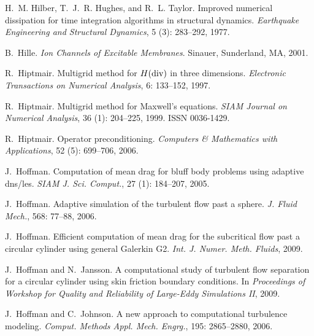 \begin{thebibliography}{467}
H.~M. Hilber, T.~J.~R. Hughes, and R.~L. Taylor.
\newblock Improved numerical dissipation for time integration algorithms in
  structural dynamics.
\newblock \emph{Earthquake Engineering and Structural Dynamics}, 5
  (3): 283--292, 1977.

B.~Hille.
\newblock \emph{Ion Channels of Excitable Membranes}.
\newblock Sinauer, Sunderland, MA, 2001.

R.~Hiptmair.
\newblock Multigrid method for {$H({\rm div})$} in three dimensions.
\newblock \emph{Electronic Transactions on Numerical Analysis}, 6:
  133--152, 1997.

R.~Hiptmair.
\newblock Multigrid method for {M}axwell's equations.
\newblock \emph{SIAM Journal on Numerical Analysis}, 36 (1):
  204--225, 1999.
\newblock ISSN 0036-1429.

R.~Hiptmair.
\newblock Operator preconditioning.
\newblock \emph{Computers \& Mathematics with Applications}, 52
  (5): 699--706, 2006.

J.~Hoffman.
\newblock Computation of mean drag for bluff body problems using adaptive
  dns/les.
\newblock \emph{SIAM J. Sci. Comput.}, 27 (1): 184--207,
  2005.

J.~Hoffman.
\newblock Adaptive simulation of the turbulent flow past a sphere.
\newblock \emph{J. Fluid Mech.}, 568: 77--88, 2006.

J.~Hoffman.
\newblock Efficient computation of mean drag for the subcritical flow past a
  circular cylinder using general {G}alerkin {G2}.
\newblock \emph{Int. J. Numer. Meth. Fluids}, 2009.

J.~Hoffman and N.~Jansson.
\newblock A computational study of turbulent flow separation for a circular
  cylinder using skin friction boundary conditions.
\newblock In \emph{Proceedings of Workshop for Quality and Reliability of
  Large-Eddy Simulations II}, 2009.

J.~Hoffman and C.~Johnson.
\newblock A new approach to computational turbulence modeling.
\newblock \emph{Comput. Methods Appl. Mech. Engrg.}, 195: 2865--2880,
  2006.


\end{thebibliography}
